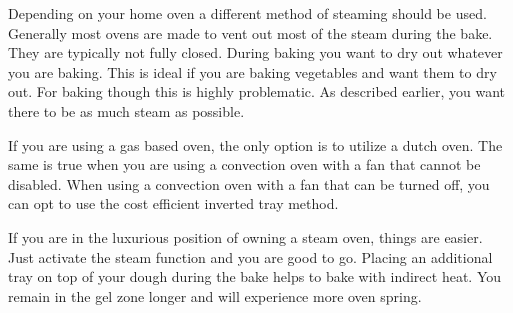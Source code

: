 \begin{table}[]
  \centering
  \caption{An overview of ovens and their different baking methods}
\end{table}

Depending on your home oven a different method
of steaming should be used. Generally most ovens
are made to vent out most of the steam during the
bake. They are typically not fully closed. During
baking you want to dry out whatever you are baking.
This is ideal if you are baking vegetables and
want them to dry out. For baking though this is
highly problematic. As described earlier, you
want there to be as much steam as possible.

If you are using a gas based oven, the only option
is to utilize a dutch oven. The same is true when you
are using a convection oven with a fan that
cannot be disabled. When using a convection
oven with a fan that can be turned off, you can
opt to use the cost efficient inverted tray
method.

If you are in the luxurious
position of owning a steam oven, things are easier.
Just activate the steam function and you are
good to go. Placing an additional tray on top of your
dough during the bake helps to bake with indirect
heat. You remain in the gel zone longer and
will experience more oven spring.

